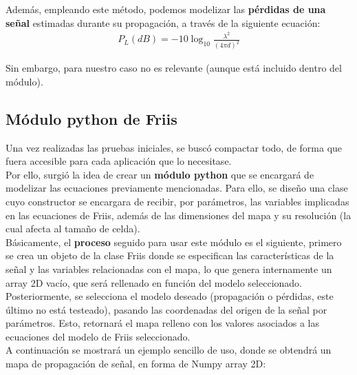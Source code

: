 Además, empleando este método, podemos modelizar las \textbf{pérdidas de una señal} estimadas durante su propagación, a través de la siguiente ecuación:\\

\begin{align}
    P_L(dB) = -10 \log_{10} \frac{\lambda^2}{(4 \pi d)^2}
\end{align}

Sin embargo, para nuestro caso no es relevante (aunque está incluido dentro del módulo).\\

\subsection{Módulo python de Friis}
\label{subsec:friis-module}

Una vez realizadas las pruebas iniciales, se buscó compactar todo, de forma que fuera accesible para cada aplicación que lo necesitase.\\

Por ello, surgió la idea de crear un \textbf{módulo python} que se encargará de modelizar las ecuaciones previamente mencionadas. Para ello, se diseño una clase cuyo constructor se encargara de recibir, por parámetros, las variables implicadas en las ecuaciones de Friis, además de las dimensiones del mapa y su resolución (la cual afecta al tamaño de celda).\\

Básicamente, el \textbf{proceso} seguido para usar este módulo es el siguiente, primero se crea un objeto de la clase Friis donde se especifican las características de la señal y las variables relacionadas con el mapa, lo que genera internamente un array 2D vacío, que será rellenado en función del modelo seleccionado. Posteriormente, se selecciona el modelo deseado (propagación o pérdidas, este último no está testeado), pasando las coordenadas del origen de la señal por parámetros. Esto, retornará el mapa relleno con los valores asociados a las ecuaciones del modelo de Friis seleccionado.\\

A continuación se mostrará un ejemplo sencillo de uso, donde se obtendrá un mapa de propagación de señal, en forma de Numpy array 2D:

